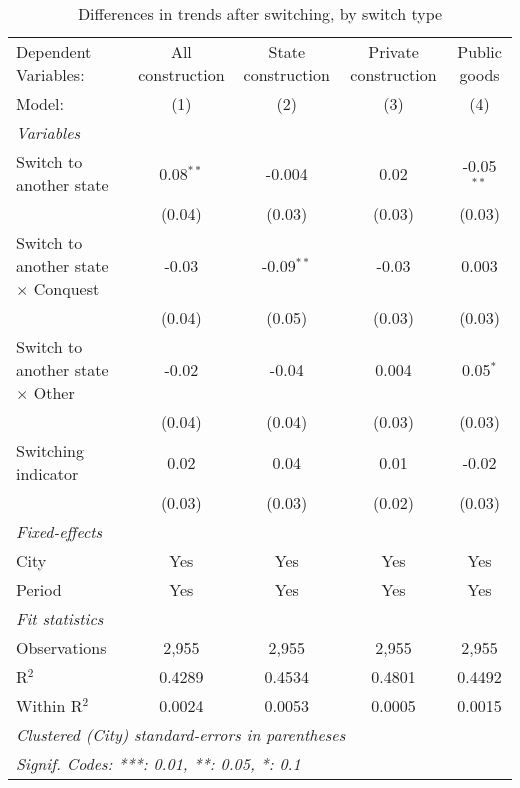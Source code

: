 \begin{table}[htbp]
   \caption{\label{tab:baseline_100y} Differences in trends after switching, by switch type}
   \centering
   \begin{tabular}{lcccc}
      \tabularnewline \midrule \midrule
      Dependent Variables:                       & All construction & State construction & Private construction & Public goods\\  
      Model:                                     & (1)              & (2)                & (3)                  & (4)\\  
      \midrule
      \emph{Variables}\\
      Switch to another state                    & 0.08$^{**}$      & -0.004             & 0.02                 & -0.05$^{**}$\\   
                                                 & (0.04)           & (0.03)             & (0.03)               & (0.03)\\   
      Switch to another state $\times$ Conquest  & -0.03            & -0.09$^{**}$       & -0.03                & 0.003\\   
                                                 & (0.04)           & (0.05)             & (0.03)               & (0.03)\\   
      Switch to another state $\times$ Other     & -0.02            & -0.04              & 0.004                & 0.05$^{*}$\\   
                                                 & (0.04)           & (0.04)             & (0.03)               & (0.03)\\   
      Switching indicator                        & 0.02             & 0.04               & 0.01                 & -0.02\\   
                                                 & (0.03)           & (0.03)             & (0.02)               & (0.03)\\   
      \midrule
      \emph{Fixed-effects}\\
      City                                       & Yes              & Yes                & Yes                  & Yes\\  
      Period                                     & Yes              & Yes                & Yes                  & Yes\\  
      \midrule
      \emph{Fit statistics}\\
      Observations                               & 2,955            & 2,955              & 2,955                & 2,955\\  
      R$^2$                                      & 0.4289           & 0.4534             & 0.4801               & 0.4492\\  
      Within R$^2$                               & 0.0024           & 0.0053             & 0.0005               & 0.0015\\  
      \midrule \midrule
      \multicolumn{5}{l}{\emph{Clustered (City) standard-errors in parentheses}}\\
      \multicolumn{5}{l}{\emph{Signif. Codes: ***: 0.01, **: 0.05, *: 0.1}}\\
   \end{tabular}
   

\end{table}
